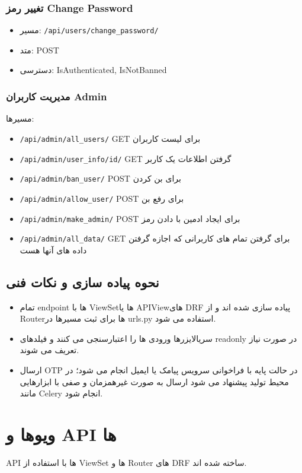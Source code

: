 \subsubsection{تغییر رمز Change Password}
\begin{itemize}
  \item مسیر: \texttt{/api/users/change\_password/}
  \item متد: POST
  \item دسترسی: IsAuthenticated, IsNotBanned
\end{itemize}

\subsubsection{مدیریت کاربران Admin}
مسیرها:
\begin{itemize}
  \item \texttt{/api/admin/all\_users/}  GET برای لیست کاربران
  \item \texttt{/api/admin/user\_info/{id}/}  GET گرفتن اطلاعات یک کاربر
  \item \texttt{/api/admin/ban\_user/}  POST برای بن کردن
  \item \texttt{/api/admin/allow\_user/} POST برای رفع بن
  \item \texttt{/api/admin/make\_admin/} POST برای ایجاد ادمین با دادن رمز
  \item \texttt{/api/admin/all\_data/} GET برای گرفتن تمام  های کاربرانی که اجازه گرفتن داده های آنها هست
\end{itemize}

\subsection{نحوه پیاده سازی و نکات فنی}
\begin{itemize}
  \item تمام endpoint ها با ViewSetها یا APIViewهای DRF پیاده سازی شده اند و از Routerها برای ثبت مسیرها در urls.py استفاده می شود.
  \item سریالایزرها ورودی ها را اعتبارسنجی می کنند و فیلدهای readonly در صورت نیاز تعریف می شوند.
  \item ارسال OTP در حالت پایه با فراخوانی سرویس پیامک یا ایمیل انجام می شود؛ در محیط تولید پیشنهاد می شود ارسال به صورت غیرهمزمان و صفی با ابزارهایی مانند Celery انجام شود.
\end{itemize}

\section{ویوها و API ها}
API ها با استفاده از ViewSet ها و Router های DRF ساخته شده اند.

